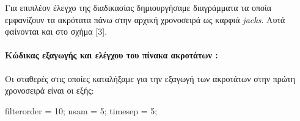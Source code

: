 \documentclass[11pt,]{article}
\newenvironment{Shaded}{}{}
\newcommand{\CommentTok}[1]{\textcolor[rgb]{0.38,0.63,0.69}{\textit{#1}}}
\newcommand{\FloatTok}[1]{\textcolor[rgb]{0.25,0.63,0.44}{#1}}
\newcommand{\NormalTok}[1]{#1}
\newcommand{\StringTok}[1]{\textcolor[rgb]{0.25,0.44,0.63}{#1}}
\let\oldparagraph\paragraph
\renewcommand{\paragraph}[1]{\oldparagraph{#1}\mbox{}}
\begin{document}
Για επιπλέον έλεγχο της διαδικασίας δημιουργήσαμε διαγράμματα τα οποία
εμφανίζουν τα ακρότατα πάνω στην αρχική χρονοσειρά ως καρφιά
\emph{jacks}. Αυτά φαίνονται και στο σχήμα {[}3{]}.

\hypertarget{ux3baux3ceux3b4ux3b9ux3baux3b1ux3c2-ux3b5ux3beux3b1ux3b3ux3c9ux3b3ux3aeux3c2-ux3baux3b1ux3b9-ux3b5ux3bbux3adux3b3ux3c7ux3bfux3c5-ux3c4ux3bfux3c5-ux3c0ux3afux3bdux3b1ux3baux3b1-ux3b1ux3baux3c1ux3bfux3c4ux3acux3c4ux3c9ux3bd}{%
\paragraph{Κώδικας εξαγωγής και ελέγχου του πίνακα ακροτάτων
:}\label{ux3baux3ceux3b4ux3b9ux3baux3b1ux3c2-ux3b5ux3beux3b1ux3b3ux3c9ux3b3ux3aeux3c2-ux3baux3b1ux3b9-ux3b5ux3bbux3adux3b3ux3c7ux3bfux3c5-ux3c4ux3bfux3c5-ux3c0ux3afux3bdux3b1ux3baux3b1-ux3b1ux3baux3c1ux3bfux3c4ux3acux3c4ux3c9ux3bd}}

\begin{Shaded}
\end{Shaded}

Οι σταθερές στις οποίες καταλήξαμε για την εξαγωγή των ακροτάτων στην
πρώτη χρονοσειρά είναι οι εξής:

\begin{Shaded}
\begin{Highlighting}[]
\NormalTok{filterorder = }\FloatTok{10}\NormalTok{;}
\NormalTok{nsam = }\FloatTok{5}\NormalTok{;}
\NormalTok{timesep = }\FloatTok{5}\NormalTok{;}
\end{Highlighting}
\end{Shaded}
\end{document}
